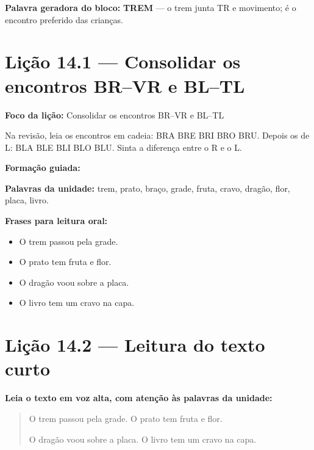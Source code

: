 \textbf{Palavra geradora do bloco:} \textbf{TREM} --- o trem junta TR e movimento; é o encontro preferido das crianças.

\section{Lição 14.1 --- Consolidar os encontros BR–VR e BL–TL}

\textbf{Foco da lição:} Consolidar os encontros BR–VR e BL–TL


\begin{boquinha}
Na revisão, leia os encontros em cadeia: BRA BRE BRI BRO BRU. Depois os de L: BLA BLE BLI BLO BLU. Sinta a diferença entre o R e o L.
\end{boquinha}

\noindent\textbf{Formação guiada:}

\begin{center}
\end{center}

\noindent\textbf{Palavras da unidade:} trem, prato, braço, grade, fruta, cravo, dragão, flor, placa, livro.

\noindent\textbf{Frases para leitura oral:}
\begin{itemize}[leftmargin=1.6em]
  \item O trem passou pela grade.
  \item O prato tem fruta e flor.
  \item O dragão voou sobre a placa.
  \item O livro tem um cravo na capa.
\end{itemize}

\section{Lição 14.2 --- Leitura do texto curto}

\noindent\textbf{Leia o texto em voz alta, com atenção às palavras da unidade:}


\begin{quote}
O trem passou pela grade. O prato tem fruta e flor.

O dragão voou sobre a placa. O livro tem um cravo na capa.
\end{quote}

